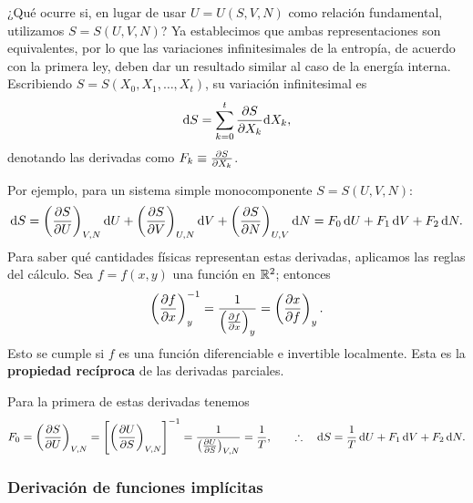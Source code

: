 ¿Qué ocurre si, en lugar de usar $U=U(S,V,N)$ como relación fundamental, utilizamos
$S=S(U,V,N)$? Ya establecimos que ambas representaciones son equivalentes, por lo que las
variaciones infinitesimales de la entropía, de acuerdo con la primera ley, deben dar un resultado
similar al caso de la energía interna. Escribiendo $S=S(X_0,X_1,\dots,X_t)$, su variación
infinitesimal es
\begin{equation*}
  \dd S=\sum_{k=0}^{t}\pdv{S}{X_k}\dd X_k,
\end{equation*}
denotando las derivadas como $F_k\equiv\pdv{S}{X_k}$.

Por ejemplo, para un sistema simple monocomponente $S=S(U,V,N)$:
\begin{equation*}
  \dd S=\left(\frac{\partial S}{\partial U}\right)_{V,N}\dd U+\left(\frac{\partial S}{\partial V}\right)_{U,N}\dd V+\left(\frac{\partial S}{\partial N}\right)_{U,V}\dd N=F_0\,\dd U+F_1\,\dd V+F_2\,\dd N.
\end{equation*}
Para saber qué cantidades físicas representan estas derivadas, aplicamos las reglas del cálculo.
Sea $f=f(x,y)$ una función en $\mathbb{R}^{2}$; entonces
\begin{equation*}
  \left(\frac{\partial f}{\partial x}\right)_{y}^{-1}=\frac{1}{\left(\frac{\partial f}{\partial x}\right)_{y}}=\left(\frac{\partial x}{\partial f}\right)_{y}.
\end{equation*}
Esto se cumple si $f$ es una función diferenciable e invertible localmente. Esta es la
\textbf{propiedad recíproca} de las derivadas parciales.

Para la primera de estas derivadas tenemos
\begin{equation*}
  F_0=\left(\frac{\partial S}{\partial U}\right)_{V,N}=\left[\left(\frac{\partial U}{\partial S}\right)_{V,N}\right]^{-1}=\frac{1}{\left(\frac{\partial U}{\partial S}\right)_{V,N}}=\frac{1}{T},
  \qquad\therefore\quad
  \dd S=\frac{1}{T}\,\dd U+F_1\,\dd V+F_2\,\dd N.
\end{equation*}

\subsubsection*{Derivación de funciones implícitas}

